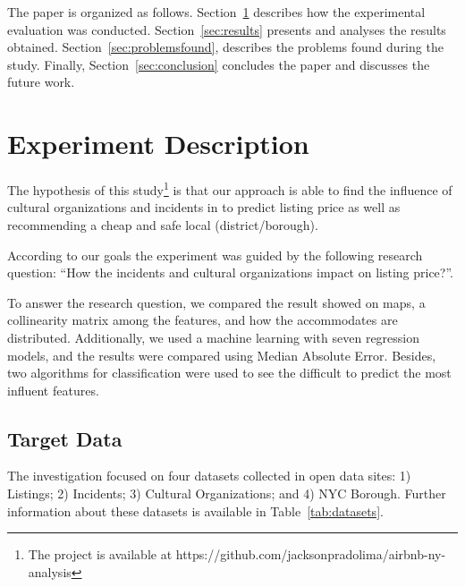 \documentclass[sigconf]{acmart}
\begin{document}
The paper is organized as follows. Section~\ref{sec:experiment_description} describes how the experimental evaluation was conducted. Section~\ref{sec:results} presents and analyses the results obtained. Section~\ref{sec:problemsfound}, describes the problems found during the study. Finally, Section~\ref{sec:conclusion} concludes the paper and discusses the future work.

\section{Experiment Description}
\label{sec:experiment_description}

The hypothesis of this study\footnote{The project is available at https://github.com/jacksonpradolima/airbnb-ny-analysis} is that our approach is able to find the influence of cultural organizations and incidents in to predict listing price as well as recommending a cheap and safe local (district/borough). 

According to our goals the experiment was guided by the following research question: ``How the incidents and cultural organizations impact on listing price?''.

To answer the research question, we compared the result showed on maps, a collinearity matrix among the features, and how the accommodates are distributed. Additionally, we used a machine learning with seven regression models, and the results were compared using Median Absolute Error. Besides, two algorithms for classification were used to see the difficult to predict the most influent features.

\subsection{Target Data}
\label{sec:experiment_description:target_data}

The investigation focused on four datasets collected in open data sites: 1) Listings; 2) Incidents; 3) Cultural Organizations; and 4) NYC Borough. Further information about these datasets is available in Table~\ref{tab:datasets}.
\end{document}
